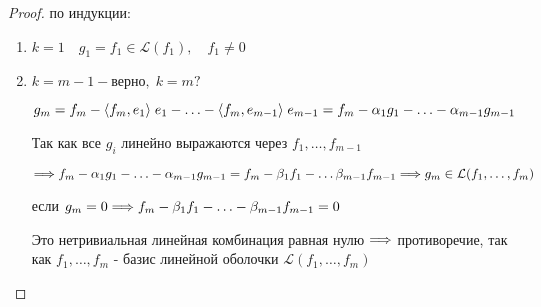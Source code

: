 \vspace{0.4cm}
\begin{proof}
    по индукции:
    
    \begin{enumerate}
    
    
        \item $ k = 1 \quad g_{1} = f_{1} \in \mathcal{L}(f_{1}), \quad f_{1} \neq 0$
        
        
        \item $k = m - 1  - \text{верно}, \; k = m ?$ 
        \nl

        $g_{m} = f_{m} - \langle f_{m}, e_{1} \rangle \; e_{1} - \ldots - \langle f_{m}, e_{m-1} \rangle \; e_{m-1} = f_{m} - \alpha_{1} g_{1} - \ldots - \alpha_{m-1} g_{m-1}$
        \nl
        
        Так как все $g_{i}$ линейно выражаются через $f_{1}, \ldots, f_{m-1}$
        \nl
        
        $\lra  f_{m} - \alpha_{1} g_{1} - \ldots - \alpha_{m-1} g_{m-1} = f_{m} - \beta_{1}f_{1} - \ldots \beta_{m-1}f_{m-1} \quad  \nl \lra g_{m} \in \mathcal{L}(f_{1}, \ldots, f_{m})$        
        \nl 
        
        если $g_{m} = 0 \Longrightarrow f_{m} - \beta_{1}f_{1} - \ldots - \beta_{m-1}f_{m-1} = 0$
        \nl 
        
        Это нетривиальная линейная комбинация равная нулю $\Longrightarrow$ противоречие, так как $f_{1}, \ldots, f_{m}$ - базис линейной оболочки $\mathcal{L}(f_{1}, \ldots, f_{m})$ 
    \end{enumerate}
\end{proof}

\clearpage

